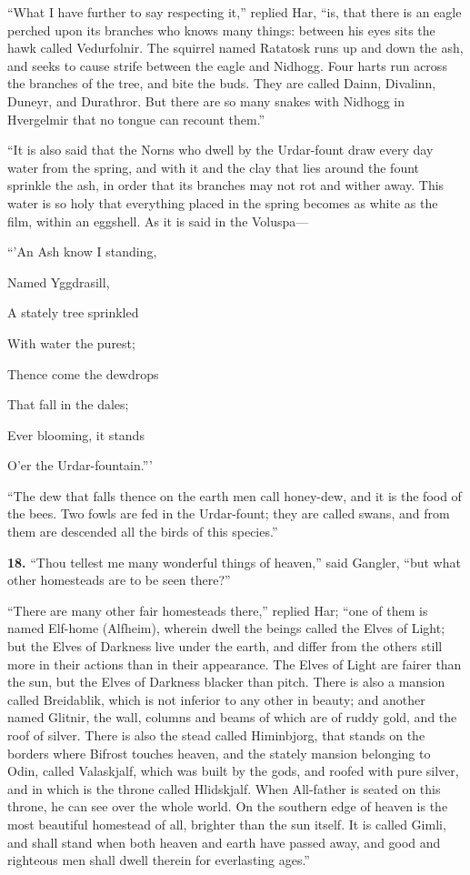 ``What I have further to say respecting it,'' replied Har, ``is, that
there is an eagle perched upon its branches who knows many things:
between his eyes sits the hawk called Vedurfolnir. The squirrel named
Ratatosk runs up and down the ash, and seeks to cause strife between
the eagle and Nidhogg. Four harts run across the branches of the tree,
and bite the buds. They are called Dainn, Divalinn, Duneyr, and
Durathror. But there are so many snakes with Nidhogg in Hvergelmir
that no tongue can recount them.''

``It is also said that the Norns who dwell by the Urdar-fount draw
every day water from the spring, and with it and the clay that lies
around the fount sprinkle the ash, in order that its branches may not
rot and wither away. This water is so holy that everything placed in
the spring becomes as white as the film, within an eggshell. As it is
said in the Voluspa—

``'An Ash know I standing,

Named Yggdrasill,

A stately tree sprinkled

With water the purest;

Thence come the dewdrops

That fall in the dales;

Ever blooming, it stands

O'er the Urdar-fountain.'''

``The dew that falls thence on the earth men call honey-dew, and it is
the food of the bees. Two fowls are fed in the Urdar-fount; they are
called swans, and from them are descended all the birds of this
species.''


\textbf{18.} ``Thou tellest me many wonderful things of heaven,'' said Gangler,
``but what other homesteads are to be seen there?''

``There are many other fair homesteads there,'' replied Har; ``one of
them is named Elf-home (Alfheim), wherein dwell the beings called the
Elves of Light; but the Elves of Darkness live under the earth, and
differ from the others still more in their actions than in their
appearance. The Elves of Light are fairer than the sun, but the Elves
of Darkness blacker than pitch. There is also a mansion called
Breidablik, which is not inferior to any other in beauty; and another
named Glitnir, the wall, columns and beams of which are of ruddy gold,
and the roof of silver. There is also the stead called Himinbjorg,
that stands on the borders where Bifrost touches heaven, and the
stately mansion belonging to Odin, called Valaskjalf, which was built
by the gods, and roofed with pure silver, and in which is the throne
called Hlidskjalf. When All-father is seated on this throne, he can
see over the whole world. On the southern edge of heaven is the most
beautiful homestead of all, brighter than the sun itself. It is called
Gimli, and shall stand when both heaven and earth have passed away,
and good and righteous men shall dwell therein for everlasting ages.''

